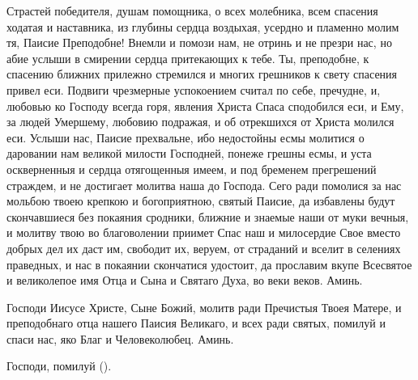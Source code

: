 


Страстей победителя, душам помощника, о всех молебника, всем спасения ходатая и наставника, из глубины сердца воздыхая, усердно и пламенно молим тя, Паисие Преподобне! Внемли и помози нам, не отринь и не презри нас, но абие услыши в смирении сердца притекающих к тебе. Ты, преподобне, к спасению ближних прилежно стремился и многих грешников к свету спасения привел еси. Подвиги чрезмерные успокоением считал по себе, пречудне, и, любовью ко Господу всегда горя, явления Христа Спаса сподобился еси, и Ему, за людей Умершему, любовию подражая, и об отрекшихся от Христа молился еси. Услыши нас, Паисие прехвальне, ибо недостойны есмы молитися о даровании нам великой милости Господней, понеже грешны есмы, и уста оскверненныя и сердца отягощенныя имеем, и под бременем прегрешений страждем, и не достигает молитва наша до Господа. Сего ради помолися за нас мольбою твоею крепкою и богоприятною, святый Паисие, да избавлены будут скончавшиеся без покаяния сродники, ближние и знаемые наши от муки вечныя, и молитву твою во благоволении приимет Спас наш и милосердие Свое вместо добрых дел их даст им, свободит их, веруем, от страданий и вселит в селениях праведных, и нас в покаянии скончатися удостоит, да прославим вкупе Всесвятое и великолепое имя Отца и Сына и Святаго Духа, во веки веков. Аминь. 





Господи Иисусе Христе, Сыне Божий, молитв ради Пречистыя Твоея Матере, и преподобнаго отца нашего Паисия Великаго, и всех ради святых, помилуй и спаси нас, яко Благ и Человеколюбец. Аминь. 


Господи, помилуй (). 
